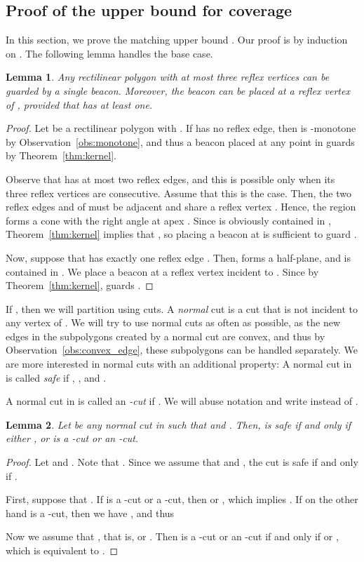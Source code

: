 \documentclass[11pt]{article}
\newtheorem{lemma}{Lemma}
\theoremstyle{definition}
\begin{document}
\subsection{Proof of the upper bound for coverage}\label{subsec:upper_bound_coverage}

In this section, we prove the matching upper bound .
Our proof is by induction on .
The following lemma handles the base case.
\begin{lemma} \label{lem:coverage_base}
 Any rectilinear polygon  with at most three reflex vertices can be guarded by
 a single beacon.  Moreover, the beacon  can be placed at a reflex vertex of ,
 provided that  has at least one.
\end{lemma}
\begin{proof}
Let  be a rectilinear polygon with .
If  has no reflex edge, then  is -monotone by Observation~\ref{obs:monotone},
and thus a beacon placed at any point in  guards 
by Theorem~\ref{thm:kernel}.

Observe that  has at most two reflex edges,
and this is possible only when its three reflex vertices are consecutive.
Assume that this is the case.
Then, the two reflex edges  and  of  must be adjacent and share a reflex vertex .
Hence, the region  forms a cone with the right angle at apex .
Since  is obviously contained in ,  Theorem~\ref{thm:kernel}
implies that , so placing a beacon at  is sufficient to guard .

Now, suppose that  has exactly one reflex edge .
Then,  forms a half-plane, and  is contained in .
We place a beacon  at a reflex vertex incident to .
Since  by Theorem~\ref{thm:kernel},
 guards .
\end{proof}

If , then we will partition  using cuts.
A {\it normal} cut is a cut that is not incident to any vertex of .
We will try to use normal cuts as often as possible,
as the new edges in the subpolygons created by a normal cut are convex,
and thus by Observation~\ref{obs:convex_edge},
these subpolygons can be handled separately.
We are more interested in normal cuts with an additional property:
A normal cut  in  is called \emph{safe} if
, , and
.


A normal cut  in  is called an \emph{-cut} if .
We will abuse notation and write  instead of .
\begin{lemma} \label{lem:safe_cut}
 Let  be any normal cut in  such that  and .
 Then,  is safe if and only if either , or
  is a -cut or an -cut.
\end{lemma}
\begin{proof}
Let  and .
Note that .
Since we assume that  and ,
the cut  is safe if and only if
.


First, suppose that .
If  is  a -cut or a -cut, 
then  or , which implies 
.
If on the other  hand  is a -cut, then we have , and
thus


Now we assume that , that is,  or .
Then  is a -cut or an -cut if and only if   or , which 
is equivalent to 
.
\end{proof}
\end{document}
